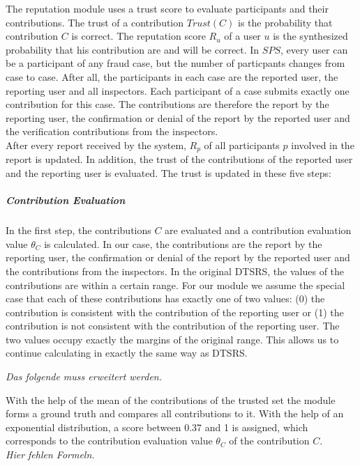 \documentclass[
a4paper,     %
titlepage,   %
14pt         %
]{scrartcl}  %
\theoremstyle{mystyle}
\begin{document}
The reputation module uses a trust score to evaluate participants and their contributions. The trust of a contribution $Trust(C)$ is the probability that contribution $C$ is correct. The reputation score $R_u$ of a user $u$ is the synthesized probability that his contribution are and will be correct. In $SPS$, every user can be a participant of any fraud case, but the number of particpants changes from case to case. After all, the participants in each case are the reported user, the reporting user and all inspectors. Each participant of a case submits exactly one contribution for this case. The contributions are therefore the report by the reporting user, the confirmation or denial of the report by the reported user and the verification contributions from the inspectors.\\

After every report received by the system, $R_p$ of all participants $p$ involved in the report is updated. In addition, the trust of the contributions of the reported user and the reporting user is evaluated. The trust is updated in these five steps:

\subparagraph{Contribution Evaluation}In the first step, the contributions $C$ are evaluated and a contribution evaluation value $\theta_C $ is calculated. In our case, the contributions are the report by the reporting user, the confirmation or denial of the report by the reported user and the contributions from the inspectors. In the original DTSRS, the values of the contributions are within a certain range. For our module we assume the special case that each of these contributions has exactly one of two values: (0) the contribution is consistent with the contribution of the reporting user or (1) the contribution is not consistent with the contribution of the reporting user. The two values occupy exactly the margins of the original range. This allows us to continue calculating in exactly the same way as DTSRS.

\textit{Das folgende muss erweitert werden.}

With the help of the mean of the contributions of the trusted set the module forms a ground truth and compares all contributions to it. With the help of an exponential distribution, a score between 0.37 and 1 is assigned, which corresponds to the contribution evaluation value $\theta_C $ of the contribution $C$.\\

\textit{Hier fehlen Formeln.}
\end{document}
